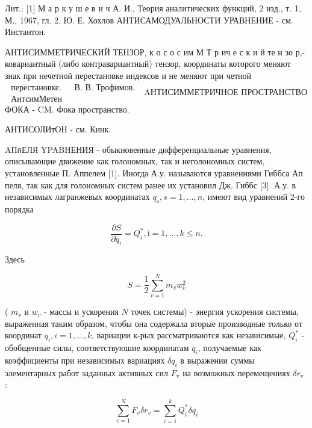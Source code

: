 \documentclass[10pt]{article}
\begin{document}
Лит.: [1] М а р к у ш е в и ч А. И., Теория аналитических функций, 2 изд., т. 1, М., 1967, гл. 2. Ю. Е. Хохлов АНТИСАМОДУАЛЬНОСТИ УРАВНЕНИЕ - см. Инстантон.



АНТИСИММЕТРИЧЕСКИЙ ТЕНЗОР, к о с о с им М Т р ич е с к и й те н зо р,- ковариантный (либо контравариантный) тензор, координаты которого меняют знак при нечетной перестановке индексов и не меняют при четной $\begin{array}{ll}\text { перестановке. } & \text { В. В. Трофимов. } \\ \text { АнтсимМетен }\end{array}$ AНТИСИММЕТРИЧНОЕ ПРОСТРАНСТВО ФОКА - $\mathrm{CM}$. Фока пространство.



АНТИСОЛИтОН - см. Кинк.



AПกЕЛЯ YPABHЕНИЯ - обыкновенные дифференциальные уравнения, описывающие движение как голономных, так и неголономных систем, установленные П. Аппелем [1]. Иногда А.у. называются уравнениями Гиббса Ап пеля, так как для голономных систем ранее их установил Дж. Гиббс [3]. А.у. в независимых лагранжевых координатах $q_{s}, s=1, \ldots, n$, имеют вид уравнений 2-го порядка



\[

\frac{\partial S}{\partial \ddot{q}_{i}}=Q_{i}^{*}, \mathrm{i}=1, \ldots, k \leqslant n .

\]



Здесь



\[

S=\frac{1}{2} \sum_{v=1}^{N} m_{v} w_{v}^{2}

\]



( $m_{v}$ и $w_{v}$ - массы и ускорения $N$ точек системы) - энергия ускорения системы, выраженная таким образом, чтобы она содержала вторые производные только от координат $q_{i}, i=1, \ldots, k$, вариации к-рых рассматриваются как независимые, $Q_{i}^{*}$ - обобщенные силы, соответствуюшие координатам $q_{i}$, получаемые как коэффициенты при независимых вариациях $\delta q_{i}$ в выражении суммы элементарных работ заданных активных сил $F_{\mathrm{v}}$ на возможных перемещениях $\delta r_{\mathrm{v}}$ :



\[

\sum_{v=1}^{N} F_{v} \delta r_{v}=\sum_{i=1}^{k} Q_{i}^{*} \delta q_{i}

\]
\end{document}
